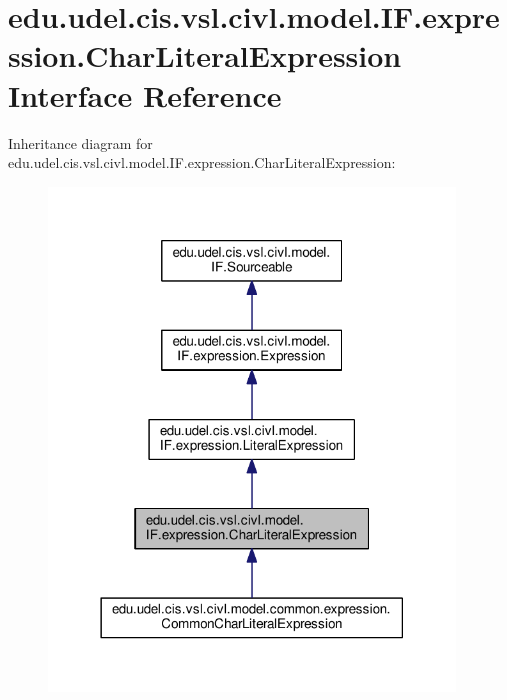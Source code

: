 \hypertarget{interfaceedu_1_1udel_1_1cis_1_1vsl_1_1civl_1_1model_1_1IF_1_1expression_1_1CharLiteralExpression}{}\section{edu.\+udel.\+cis.\+vsl.\+civl.\+model.\+I\+F.\+expression.\+Char\+Literal\+Expression Interface Reference}
\label{interfaceedu_1_1udel_1_1cis_1_1vsl_1_1civl_1_1model_1_1IF_1_1expression_1_1CharLiteralExpression}


Inheritance diagram for edu.\+udel.\+cis.\+vsl.\+civl.\+model.\+I\+F.\+expression.\+Char\+Literal\+Expression\+:
\nopagebreak
\begin{figure}[H]
\begin{center}
\leavevmode
\includegraphics[width=306pt]{interfaceedu_1_1udel_1_1cis_1_1vsl_1_1civl_1_1model_1_1IF_1_1expression_1_1CharLiteralExpression__inherit__graph}
\end{center}
\end{figure}


